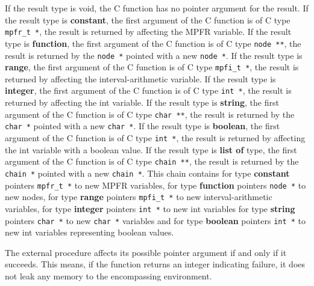 \begin{itemize}
   If the \sollya result type is void, the C function has no pointer
   argument for the result.  If the \sollya result type is \textbf{constant}, the
   first argument of the C function is of C type \texttt{mpfr\_t *}, the result is
   returned by affecting the MPFR variable.  If the \sollya result type
   is \textbf{function}, the first argument of the C function is of C type \texttt{node **},
   the result is returned by the \texttt{node *} pointed with a new \texttt{node *}.
   If the \sollya result type is \textbf{range}, the first argument of the C
   function is of C type \texttt{mpfi\_t *}, the result is returned by affecting
   the interval-arithmetic variable.  If the \sollya result type is \textbf{integer}, the first
   argument of the C function is of C type \texttt{int *}, the result is returned
   by affecting the int variable.  If the \sollya result type is \textbf{string},
   the first argument of the C function is of C type \texttt{char **}, the result
   is returned by the \texttt{char *} pointed with a new \texttt{char *}.  If the \sollya
   result type is \textbf{boolean}, the first argument of the C function is of C
   type \texttt{int *}, the result is returned by affecting the int variable with
   a boolean value.  If the \sollya result type is \textbf{list of} type, the
   first argument of the C function is of C type \texttt{chain **}, the result is
   returned by the \texttt{chain *} pointed with a new \texttt{chain *}.  This chain
   contains for \sollya type \textbf{constant} pointers \texttt{mpfr\_t *} to new MPFR
   variables, for \sollya type \textbf{function} pointers \texttt{node *} to new nodes, for
   \sollya type \textbf{range} pointers \texttt{mpfi\_t *}  to new interval-arithmetic variables, for
   \sollya type \textbf{integer} pointers \texttt{int *} to new int variables for \sollya
   type \textbf{string} pointers \texttt{char *} to new \texttt{char *} variables and for \sollya
   type \textbf{boolean} pointers \texttt{int *} to new int variables representing boolean
   values.
    	       
   The external procedure affects its possible pointer argument if and
   only if it succeeds.  This means, if the function returns an integer
   indicating failure, it does not leak any memory to the encompassing
   environment.
    

\end{itemize}
